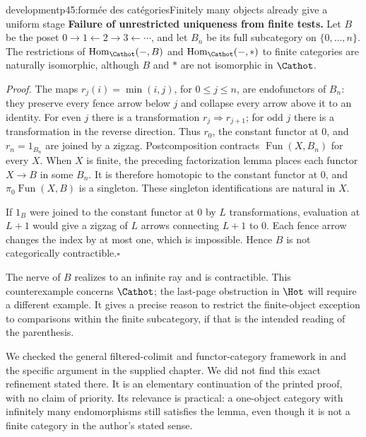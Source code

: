 \begin{dcomment}{development}{p45:formée des catégories}{Finitely many objects already give a uniform stage}
\textbf{Failure of unrestricted uniqueness from finite tests.}\ours\quad
Let $B$ be the poset $0\to1\leftarrow2\to3\leftarrow\cdots$, and let $B_n$ be its full subcategory on $\{0,\ldots,n\}$. The restrictions of $\operatorname{Hom}_{\Cathot}(-,B)$ and $\operatorname{Hom}_{\Cathot}(-,*)$ to finite categories are naturally isomorphic, although $B$ and $*$ are not isomorphic in $\Cathot$.

\textit{Proof.} The maps $r_j(i)=\min(i,j)$, for $0\leq j\leq n$, are endofunctors of $B_n$: they preserve every fence arrow below $j$ and collapse every arrow above it to an identity. For even $j$ there is a transformation $r_j\Rightarrow r_{j+1}$; for odd $j$ there is a transformation in the reverse direction. Thus $r_0$, the constant functor at $0$, and $r_n=1_{B_n}$ are joined by a zigzag. Postcomposition contracts $\operatorname{Fun}(X,B_n)$ for every $X$. When $X$ is finite, the preceding factorization lemma places each functor $X\to B$ in some $B_n$. It is therefore homotopic to the constant functor at $0$, and $\pi_0\operatorname{Fun}(X,B)$ is a singleton. These singleton identifications are natural in $X$.

If $1_B$ were joined to the constant functor at $0$ by $L$ transformations, evaluation at $L+1$ would give a zigzag of $L$ arrows connecting $L+1$ to $0$. Each fence arrow changes the index by at most one, which is impossible. Hence $B$ is not categorically contractible.\hfill$\square$

The nerve of $B$ realizes to an infinite ray and is contractible. This counterexample concerns $\Cathot$; the last-page obstruction in $\Hot$ will require a different example. It gives a precise reason to restrict the finite-object exception to comparisons within the finite subcategory, if that is the intended reading of the parenthesis.

We checked the general filtered-colimit and functor-category framework in \citet[Chapters~1 and 7]{Riehl2014} and the specific argument in the supplied chapter. We did not find this exact refinement stated there. It is an elementary continuation of the printed proof, with no claim of priority. Its relevance is practical: a one-object category with infinitely many endomorphisms still satisfies the lemma, even though it is not a finite category in the author's stated sense.
\end{dcomment}

